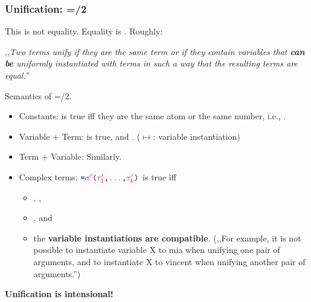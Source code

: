 

\begin{frame}[t]
\frametitle{Unification: =/2}

This is not equality. Equality is . Roughly:
\begin{center}
  ,,\emph{Two terms unify if they are the same term or if they contain variables that \textbf{can be} uniformly instantiated with terms in such a way that the resulting terms are equal.}''
\end{center}
Semantics of =/2.
\begin{itemize}
    \item Constants: \ol{=} is true iff they are the same atom or the same number, i.e., \ml{=}.
    \item Variable + Term: \ol{=}\ml{$\tau$} is true, and . ($\mapsto$: variable instantiation)
    \item Term + Variable: Similarly.
    \item Complex terms: \ml{$\sigma$}\ol{(}\ol{,} \ml{\dots} \ol{,} \ol{)}$ \textcolor{blue}{\texttt{=}} \textcolor{red}{\texttt{$\sigma'$}}\textcolor{blue}{\texttt{(}}\textcolor{red}{\texttt{$\tau_1'$}}\textcolor{blue}{\texttt{,}} \textcolor{red}{\texttt{\dots}} \textcolor{blue}{\texttt{,}} \textcolor{red}{\texttt{$\tau_k'$}}\textcolor{blue}{\texttt{)}}$ is true iff
    \begin{itemize}\footnotesize
      \item {}, , \item {}, and
      \item the \textbf{variable instantiations are compatible}.
      (,,For example, it is not possible to instantiate variable X to mia when unifying one pair of arguments, and to instantiate X to vincent when unifying another pair of arguments.'')
    \end{itemize}
 \end{itemize}
 \textbf{Unification is intensional!}

\end{frame}

